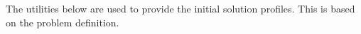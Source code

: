 The utilities below are used to provide the initial solution profiles. This is based on the problem definition.
